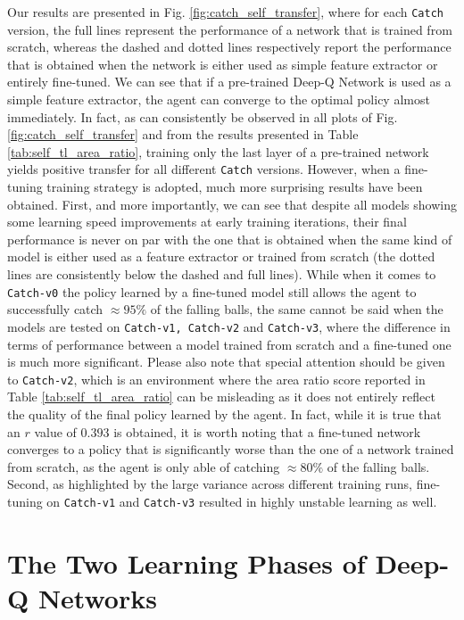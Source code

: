 Our results are presented in Fig. \ref{fig:catch_self_transfer}, where for each \texttt{Catch} version, the full lines represent the performance of a network that is trained from scratch, whereas the dashed and dotted lines respectively report the performance that is obtained when the network is either used as simple feature extractor or entirely fine-tuned. We can see that if a pre-trained Deep-Q Network is used as a simple feature extractor, the agent can converge to the optimal policy almost immediately. In fact, as can consistently be observed in all plots of Fig. \ref{fig:catch_self_transfer} and from the results presented in Table \ref{tab:self_tl_area_ratio}, training only the last layer of a pre-trained network yields positive transfer for all different \texttt{Catch} versions. However, when a fine-tuning training strategy is adopted, much more surprising results have been obtained. First, and more importantly, we can see that despite all models showing some learning speed improvements at early training iterations, their final performance is never on par with the one that is obtained when the same kind of model is either used as a feature extractor or trained from scratch (the dotted lines are consistently below the dashed and full lines). While when it comes to \texttt{Catch-v0} the policy learned by a fine-tuned model still allows the agent to successfully catch $\approx 95\%$ of the falling balls, the same cannot be said when the models are tested on \texttt{Catch-v1, Catch-v2} and \texttt{Catch-v3}, where the difference in terms of performance between a model trained from scratch and a fine-tuned one is much more significant. Please also note that special attention should be given to \texttt{Catch-v2}, which is an environment where the area ratio score reported in Table \ref{tab:self_tl_area_ratio} can be misleading as it does not entirely reflect the quality of the final policy learned by the agent. In fact, while it is true that an $r$ value of $0.393$ is obtained, it is worth noting that a fine-tuned network converges to a policy that is significantly worse than the one of a network trained from scratch, as the agent is only able of catching $\approx 80\%$ of the falling balls. Second, as highlighted by the large variance across different training runs, fine-tuning on \texttt{Catch-v1} and \texttt{Catch-v3} resulted in highly unstable learning as well.   



\section{The Two Learning Phases of Deep-Q Networks}
\label{sec:hybrid_self_transfer}

